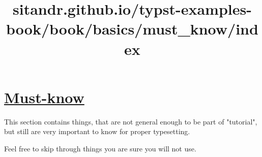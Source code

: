 \title{sitandr.github.io/typst-examples-book/book/basics/must_know/index}

\section{\texorpdfstring{\hyperref[must-know]{Must-know}}{Must-know}}\label{must-know}

This section contains things, that are not general enough to be part of
"tutorial", but still are very important to know for proper typesetting.

Feel free to skip through things you are sure you will not use.
